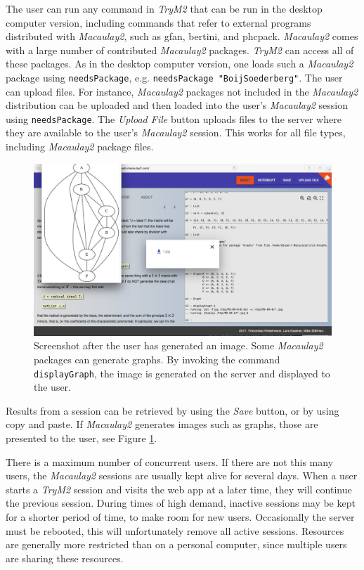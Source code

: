\documentclass[twocolumn]{article}
\def\trym2{{\it TryM2}}
\def\M2{{\it Macaulay2}}
\begin{document}
The user can run any command in \trym2 that can be run in the desktop
computer version, including commands that refer to external programs
distributed with \M2, such as gfan, bertini, and phcpack.  \M2 comes
with a large number of contributed \M2 packages.  \trym2 can access
all of these packages.  As in the desktop computer version, one loads
such a \M2 package using {\tt needsPackage}, e.g. {\tt needsPackage
  "BoijSoederberg"}.  The user can upload files. For instance, \M2
packages not included in the \M2 distribution can be uploaded and then
loaded into the user's \M2 session using {\tt needsPackage}.  The {\it
  Upload File} button uploads files to the server where they are
available to the user's \M2 session.  This works for all file types,
including \M2 package files.

\begin{figure}[htb]
    \includegraphics[width=.95\textwidth]{withGraph.jpg}
    \caption{Screenshot after the user
      has generated an image. Some \M2 packages can generate
      graphs. By invoking the command {\tt displayGraph}, the image is
      generated on the server and displayed to the user.}
    \label{fig:graph}
\end{figure}

Results from a session can be retrieved by using the {\it Save}
button, or by using copy and paste. If \M2 generates
images such as graphs, those are presented to the user, see Figure \ref{fig:graph}.

There is a maximum number of concurrent users.  If there are not this
many users, the \M2 sessions are usually kept alive for several
days. When a user starts a \trym2 session and visits the web app at a
later time, they will continue the previous session. During times of
high demand, inactive sessions may be kept for a shorter period of
time, to make room for new users.  Occasionally the server must be
rebooted, this will unfortunately remove all active sessions.
Resources are generally more restricted than on a personal computer,
since multiple users are sharing these resources.
\end{document}
